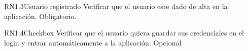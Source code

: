 \begin{BussinesRule}{RN1.3}{Usuario registrado}
	\BRitem[Descripción:] Verificar que el usuario este dado de alta en la aplicación.
	\BRitem[Nivel:] Obligatorio.
\end{BussinesRule}

\begin{BussinesRule}{RN1.4}{Checkbox}
	\BRitem[Descripción:] Verificar que el usuario quiera guardar sus credenciales en el login y entrar automáticamente a la aplicación.
	\BRitem[Nivel:] Opcional
\end{BussinesRule}
